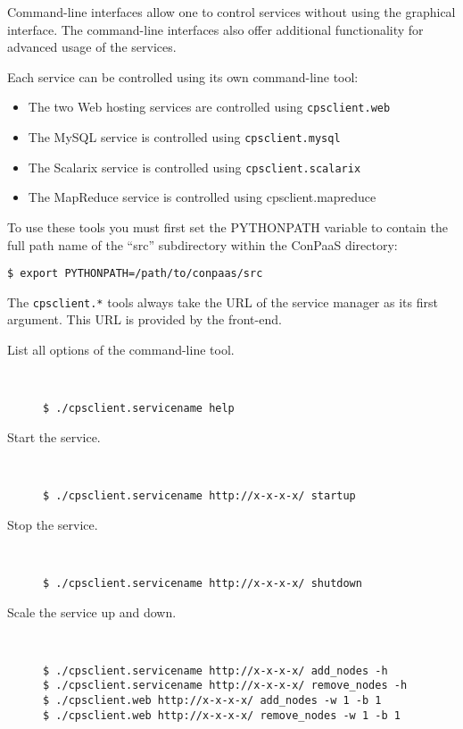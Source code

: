 \documentclass[10pt]{article}
\begin{document}
Command-line interfaces allow one to control services without using
the graphical interface. The command-line interfaces also offer
additional functionality for advanced usage of the services.

Each service can be controlled using its own command-line tool:

\begin{itemize}
\item The two Web hosting services are controlled using \texttt{cpsclient.web}
\item The MySQL service is controlled using \texttt{cpsclient.mysql}
\item The Scalarix service is controlled using \texttt{cpsclient.scalarix}
\item The MapReduce service is controlled using cpsclient.mapreduce
\end{itemize}

To use these tools you must first set the PYTHONPATH variable to
contain the full path name of the ``src'' subdirectory within the
ConPaaS directory:
\begin{verbatim}
$ export PYTHONPATH=/path/to/conpaas/src
\end{verbatim}

The \texttt{cpsclient.*} tools always take the URL of the service
manager as its first argument. This URL is provided by the front-end.

\vspace{1em}

\begin{description}
\item[List all options of the command-line tool.]~
\begin{verbatim}
$ ./cpsclient.servicename help
\end{verbatim}

\item[Start the service.]~
\begin{verbatim}
$ ./cpsclient.servicename http://x-x-x-x/ startup
\end{verbatim}

\item[Stop the service.]~
\begin{verbatim}
$ ./cpsclient.servicename http://x-x-x-x/ shutdown
\end{verbatim}

\item[Scale the service up and down.]~
\begin{verbatim}
$ ./cpsclient.servicename http://x-x-x-x/ add_nodes -h
$ ./cpsclient.servicename http://x-x-x-x/ remove_nodes -h
$ ./cpsclient.web http://x-x-x-x/ add_nodes -w 1 -b 1
$ ./cpsclient.web http://x-x-x-x/ remove_nodes -w 1 -b 1
\end{verbatim}

\end{description}
\end{document}
